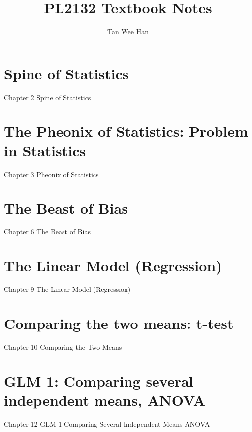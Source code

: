 \documentclass[a4paper, 12pt]{book}
\begin{document}
\title{\Large{\textbf{PL2132 Textbook Notes}}}
\author{Tan Wee Han}
\maketitle

\let\cleardoublepage\clearpage
\tableofcontents

\pagestyle{plain} %
\graphicspath{ {C:/Latex Documents/PL2132 textbook notes} }

\chapter{Spine of Statistics}
{Chapter 2 Spine of Statistics}

\chapter{The Pheonix of Statistics: Problem in Statistics}
{Chapter 3 Pheonix of Statistics}

\chapter{The Beast of Bias}
{Chapter 6 The Beast of Bias}

\chapter{The Linear Model (Regression)}  %
{Chapter 9 The Linear Model (Regression)}

\chapter{Comparing the two means: t-test}
{Chapter 10 Comparing the Two Means}

\chapter{GLM 1: Comparing several independent means, ANOVA}
{Chapter 12 GLM 1 Comparing Several Independent Means ANOVA}
\end{document}
